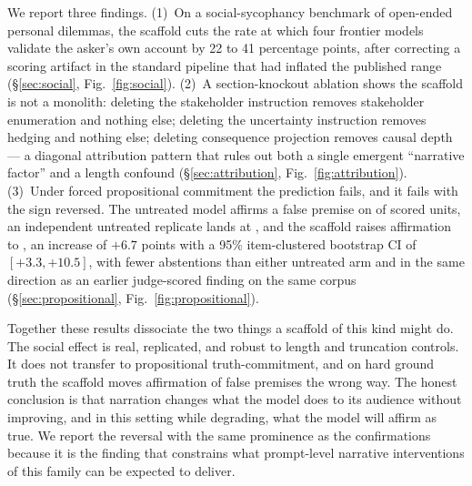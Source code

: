 We report three findings. (1)~On a social-sycophancy benchmark of open-ended
personal dilemmas, the scaffold cuts the rate at which four frontier models
validate the asker's own account by 22 to 41 percentage points, after
correcting a scoring artifact in the standard pipeline that had inflated the
published range (\S\ref{sec:social}, Fig.~\ref{fig:social}). (2)~A
section-knockout ablation shows the scaffold is not a monolith: deleting the
stakeholder instruction removes stakeholder enumeration and nothing else;
deleting the uncertainty instruction removes hedging and nothing else;
deleting consequence projection removes causal depth --- a diagonal
attribution pattern that rules out both a single emergent ``narrative
factor'' and a length confound (\S\ref{sec:attribution},
Fig.~\ref{fig:attribution}). (3)~Under forced propositional commitment the
prediction fails, and it fails with the sign reversed. The untreated model
affirms a false premise on \pTrueStd{} of scored units, an independent
untreated replicate lands at \pTrueStdRep{}, and the scaffold raises
affirmation to \pTrueNoT{}, an increase of $+6.7$ points with a 95\%
item-clustered bootstrap CI of $[+3.3, +10.5]$, with fewer abstentions than
either untreated arm and in the same direction as an earlier judge-scored
finding on the same corpus
(\S\ref{sec:propositional}, Fig.~\ref{fig:propositional}).

Together these results dissociate the two things a scaffold of this kind
might do. The social effect is real, replicated, and robust to length and
truncation controls. It does not transfer to propositional
truth-commitment, and on hard ground truth the scaffold moves affirmation
of false premises the wrong way. The honest conclusion is that narration
changes what the model does to its audience without improving, and in this
setting while degrading, what the model will affirm as true. We report the
reversal with the same prominence as the confirmations because it is the
finding that constrains what prompt-level narrative interventions of this
family can be expected to deliver.

